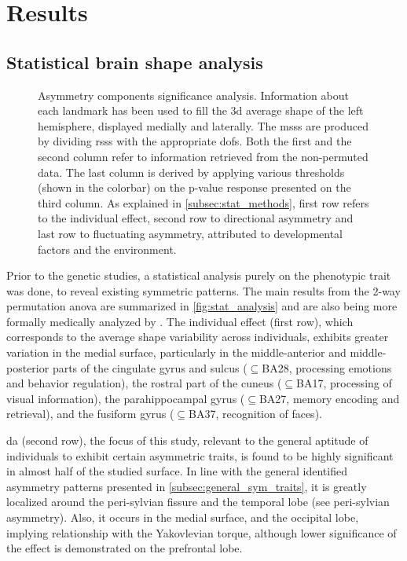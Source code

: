 \chapter{Results}\label{chap:results}
\section{Statistical brain shape analysis}

\begin{figure}[H]
	\centering
	\begin{center}
		\makebox[\textwidth]{}
	\end{center}
	\caption[Statistical brain shape analysis results]{Asymmetry components significance analysis. Information about each landmark has been used to fill the \ac{3d} average shape of the left hemisphere, displayed medially and laterally. The \acsp{mss} are produced by dividing \acsp{rss} with the appropriate \acp{dof}. Both the first and the second column refer to information retrieved from the non-permuted data. The last column is derived by applying various thresholds (shown in the colorbar) on the p-value response presented on the third column. As explained in \autoref{subsec:stat_methods}, first row refers to the individual effect, second row to directional asymmetry and last row to fluctuating asymmetry, attributed to developmental factors and the environment.}
	\label{fig:stat_analysis}	
\end{figure}

Prior to the genetic studies, a statistical analysis purely on the phenotypic trait was done, to reveal existing symmetric patterns. The main results from the 2-way permutation \ac{anova} are summarized in \autoref{fig:stat_analysis} and are also being more formally medically analyzed by \citet{Vanbiervliet2022}. The individual effect (first row), which corresponds to the average shape variability across individuals, exhibits greater variation in the medial surface, particularly in the middle-anterior and middle-posterior parts of the cingulate gyrus and sulcus ($\subseteq$BA28, processing emotions and behavior regulation), the rostral part of the cuneus ($\subseteq$BA17, processing of visual information), the parahippocampal gyrus ($\subseteq$BA27, memory encoding and retrieval), and the fusiform gyrus ($\subseteq$BA37, recognition of faces). 

\Ac{da} (second row), the focus of this study, relevant to the general aptitude of individuals to exhibit certain asymmetric traits, is found to be highly significant in almost half of the studied surface. In line with the general identified asymmetry patterns presented in \autoref{subsec:general_sym_traits}, it is greatly localized around the peri-sylvian fissure and the temporal lobe (see peri-sylvian asymmetry). Also, it occurs in the medial surface, and the occipital lobe, implying relationship with the Yakovlevian torque, although lower significance of the effect is demonstrated on the prefrontal lobe.

